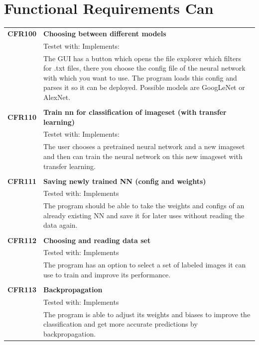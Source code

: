 \documentclass[parskip=full]{scrartcl}
\begin{document}
\section{Functional Requirements Can}
\begin{tabular}{p{2cm}p{12cm}}
\textbf{CFR100} & \textbf{Choosing between different models}\\
& Testet with: Implements: \\
& The GUI has a button which opens the file explorer which filters for .txt files, there you choose the config file of the neural network with which you want to use. The program loads this config and parses it so it can be deployed. Possible models are GoogLeNet or AlexNet.\\
& \\
\textbf{CFR110} & \textbf{Train nn for classification of imageset (with transfer learning)}\\
& Testet with: Implements: \\
& The user chooses a pretrained neural network and a new imageset and then can train the neural network on this new imageset with transfer learning.\\
& \\
\textbf {CFR111} & \textbf{Saving newly trained NN (config and weights)} \\
& Tested with: Implements\\
& The program should be able to take the weights and configs of an already existing NN and save it for later uses without reading the data again. \\
& \\
\textbf {CFR112} & \textbf{Choosing and reading data set} \\
& Tested with: Implements\\
& The program has an option to select a set of labeled images it can use to train and improve its performance. \\
& \\
\textbf {CFR113} & \textbf{Backpropagation} \\
& Tested with: Implements\\
& The program is able to adjust its weights and biases to improve the classification and get more accurate predictions by backpropagation.\\
\end{tabular}
\newpage
\end{document}
